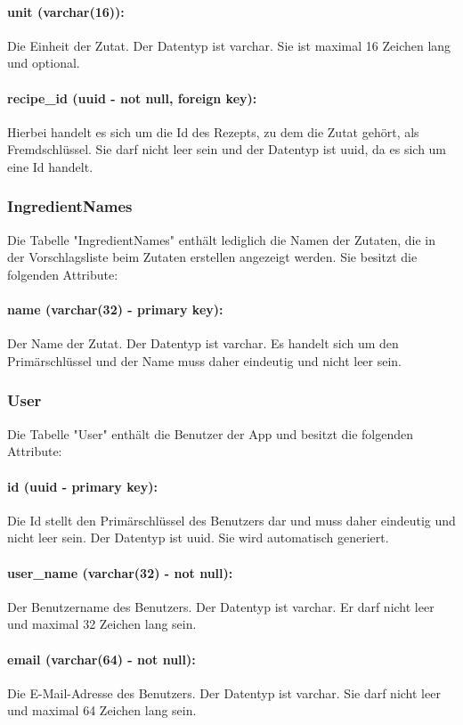 \documentclass[parskip=full]{scrartcl}
\begin{document}
\paragraph{unit (varchar(16)):} Die Einheit der Zutat. Der Datentyp ist \Gls{varchar}. Sie ist maximal 16 Zeichen lang und optional.
\paragraph{recipe\_id (uuid - not null, foreign key):} Hierbei handelt es sich um die Id des Rezepts, zu dem die Zutat gehört, als Fremdschlüssel. Sie darf nicht leer sein und der Datentyp ist \Gls{uuid}, da es sich um eine Id handelt.
\newpage
\subsubsection{IngredientNames}
Die Tabelle "IngredientNames" enthält lediglich die Namen der Zutaten, die in der Vorschlagsliste beim Zutaten erstellen angezeigt werden. Sie besitzt die folgenden Attribute:
\paragraph{name (varchar(32) - primary key):} Der Name der Zutat. Der Datentyp ist \Gls{varchar}. Es handelt sich um den Primärschlüssel und der Name muss daher eindeutig und nicht leer sein.
\newpage
\subsubsection{User}
Die Tabelle "User" enthält die Benutzer der App und besitzt die folgenden Attribute:
\paragraph{id (uuid - primary key):} Die Id stellt den Primärschlüssel des Benutzers dar und muss daher eindeutig und nicht leer sein. Der Datentyp ist \Gls{uuid}. Sie wird automatisch generiert.
\paragraph{user\_name (varchar(32) - not null):} Der Benutzername des Benutzers. Der Datentyp ist \Gls{varchar}. Er darf nicht leer und maximal 32 Zeichen lang sein.
\paragraph{email (varchar(64) - not null):} Die E-Mail-Adresse des Benutzers. Der Datentyp ist \Gls{varchar}. Sie darf nicht leer und maximal 64 Zeichen lang sein.
\end{document}
